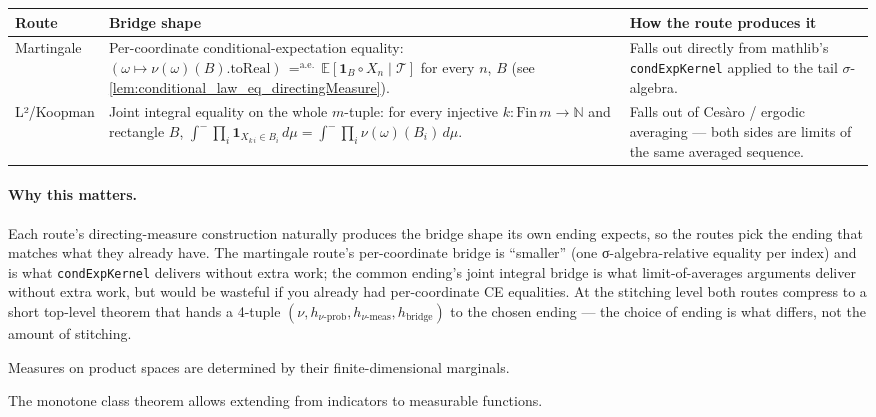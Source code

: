\begin{tabular}{p{}p{}p{}}
  \textbf{Route} & \textbf{Bridge shape} & \textbf{How the route produces it} \\
  \hline
  Martingale &
  Per-coordinate conditional-expectation equality:
  $(\omega \mapsto \nu(\omega)(B).\mathrm{toReal})
    \, =^{\mathrm{a.e.}} \, \mathbb{E}[\mathbf{1}_B \circ X_n \mid \mathcal{T}]$
  for every $n$, $B$
  (see \ref{lem:conditional_law_eq_directingMeasure}). &
  Falls out directly from mathlib's \texttt{condExpKernel} applied to
  the tail $\sigma$-algebra. \\[0.7em]
  L²/Koopman &
  Joint integral equality on the whole $m$-tuple:
  for every injective $k : \mathrm{Fin}\,m \to \mathbb{N}$ and rectangle $B$,
  $\int^- \prod_i \mathbf{1}_{X_{k\,i} \in B_i}\,d\mu
     = \int^- \prod_i \nu(\omega)(B_i)\,d\mu.$ &
  Falls out of Cesàro / ergodic averaging — both sides are limits of the
  same averaged sequence. \\
\end{tabular}

\paragraph{Why this matters.} Each route's directing-measure
construction naturally produces the bridge shape its own ending
expects, so the routes pick the ending that matches what they already
have. The martingale route's per-coordinate bridge is ``smaller'' (one
σ-algebra-relative equality per index) and is what \texttt{condExpKernel}
delivers without extra work; the common ending's joint integral bridge
is what limit-of-averages arguments deliver without extra work, but
would be wasteful if you already had per-coordinate CE equalities. At
the stitching level both routes compress to a short top-level theorem
that hands a 4-tuple
$(\nu, h_{\nu\text{-prob}}, h_{\nu\text{-meas}}, h_{\text{bridge}})$ to
the chosen ending — the choice of ending is what differs, not the
amount of stitching.

\begin{lemma}
  \label{lem:pi_system}
  \leanok
  Measures on product spaces are determined by their finite-dimensional marginals.
\end{lemma}

\begin{theorem}
  \label{thm:monotone_class}
  \leanok
  The monotone class theorem allows extending from indicators to measurable functions.
\end{theorem}


